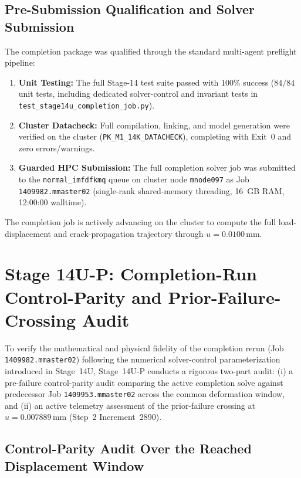 \subsection{Pre-Submission Qualification and Solver Submission}
\label{subsec:stage14u_submission}

The completion package was qualified through the standard multi-agent preflight pipeline:
\begin{enumerate}
    \item \textbf{Unit Testing:} The full Stage-14 test suite passed with $100\%$ success ($84/84$ unit tests, including dedicated solver-control and invariant tests in \texttt{test\_stage14u\_completion\_job.py}).
    \item \textbf{Cluster Datacheck:} Full compilation, linking, and model generation were verified on the cluster (\texttt{PK\_M1\_14K\_DATACHECK}), completing with Exit~0 and zero errors/warnings.
    \item \textbf{Guarded HPC Submission:} The full completion solver job was submitted to the \texttt{normal\_imfdfkmq} queue on cluster node \texttt{mnode097} as Job \texttt{1409982.mmaster02} (single-rank shared-memory threading, 16~GB RAM, 12:00:00 walltime).
\end{enumerate}
The completion job is actively advancing on the cluster to compute the full load-displacement and crack-propagation trajectory through $u = 0.0100\,\mathrm{mm}$.


\section{Stage 14U-P: Completion-Run Control-Parity and Prior-Failure-Crossing Audit}
\label{sec:stage14up_parity_audit}

To verify the mathematical and physical fidelity of the completion rerun (Job \texttt{1409982.mmaster02}) following the numerical solver-control parameterization introduced in Stage~14U, Stage~14U-P conducts a rigorous two-part audit: (i) a pre-failure control-parity audit comparing the active completion solve against predecessor Job \texttt{1409953.mmaster02} across the common deformation window, and (ii) an active telemetry assessment of the prior-failure crossing at $u = 0.007889\,\mathrm{mm}$ (Step~2 Increment~2890).

\subsection{Control-Parity Audit Over the Reached Displacement Window}
\label{subsec:stage14up_control_parity}

